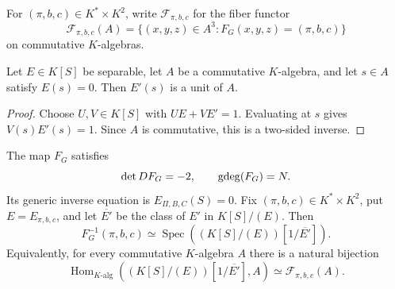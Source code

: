 For $(\pi,b,c)\in K^*\times K^2$, write $\mathcal F_{\pi,b,c}$ for the fiber
functor
\[
 \mathcal F_{\pi,b,c}(A)
 =\{(x,y,z)\in A^3:F_G(x,y,z)=(\pi,b,c)\}
\]
on commutative $K$-algebras.

\begin{lemma}\label{lem:derivative-unit}
Let $E\in K[S]$ be separable, let $A$ be a commutative $K$-algebra, and let
$s\in A$ satisfy $E(s)=0$.  Then $E'(s)$ is a unit of $A$.
\end{lemma}

\begin{proof}
Choose $U,V\in K[S]$ with $UE+VE'=1$.  Evaluating at $s$ gives
$V(s)E'(s)=1$.  Since $A$ is commutative, this is a two-sided inverse.
\end{proof}

\begin{theorem}
\label{thm:localized-gauge}
The map $F_G$ satisfies
\[
 \det DF_G=-2,
 \qquad
 \operatorname{gdeg}(F_G)=N.
\]
Its generic inverse equation is $E_{\Pi,B,C}(S)=0$.  Fix
$(\pi,b,c)\in K^*\times K^2$, put $E=E_{\pi,b,c}$, and let
$\overline{E'}$ be the class of $E'$ in $K[S]/(E)$.  Then
\begin{equation}
 \boxed{
 F_G^{-1}(\pi,b,c)
 \simeq
 \operatorname{Spec}\left((K[S]/(E))[1/\overline{E'}]\right).}
 \label{eq:localized-fiber}
\end{equation}
Equivalently, for every commutative $K$-algebra $A$ there is a natural
bijection
\begin{equation}
 \operatorname{Hom}_{K\text{-alg}}
 \left((K[S]/(E))[1/\overline{E'}],A\right)
 \simeq \mathcal F_{\pi,b,c}(A).
 \label{eq:localized-natural-fiber-equivalence}
\end{equation}
\end{theorem}

